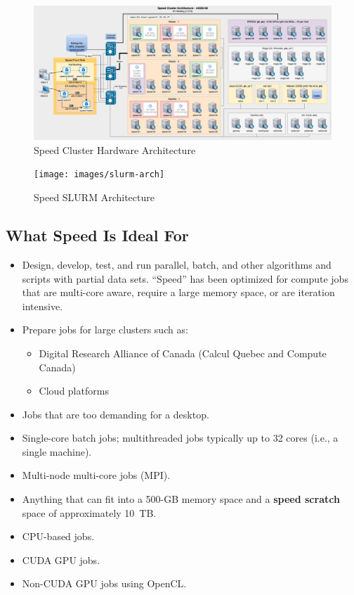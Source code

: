 \begin{figure}[htbp]
    \centering
    \includegraphics[width=\linewidth]{images/SpeedArchitecture.jpg}
    \caption{Speed Cluster Hardware Architecture}
    \label{fig:speed-architecture}
\end{figure}

\begin{figure}[htpb]
	\centering
	\texttt{[image: images/slurm-arch]}
	\caption{Speed SLURM Architecture}
	\label{fig:slurm-arch}
\end{figure}

\subsection{What Speed Is Ideal For}
\label{sect:speed-is-for}

\begin{itemize}
	\item
	Design, develop, test, and run parallel, batch, and other algorithms and scripts with partial data sets.
	``Speed'' has been optimized for compute jobs that are multi-core aware,
	require a large memory space, or are iteration intensive.

	\item
	Prepare jobs for large clusters such as:
		\begin{itemize}
			\item Digital Research Alliance of Canada (Calcul Quebec and Compute Canada)
			\item Cloud platforms
		\end{itemize}
	\item
	Jobs that are too demanding for a desktop.
	\item
	Single-core batch jobs; multithreaded jobs typically up to 32 cores (i.e., a single machine).
	\item
	Multi-node multi-core jobs (MPI).
	\item
	Anything that can fit into a 500-GB memory space and a \textbf{speed scratch} space of approximately 10~TB. 
	\item
	CPU-based jobs.
	\item
	CUDA GPU jobs.
	\item
	Non-CUDA GPU jobs using OpenCL.
\end{itemize}

